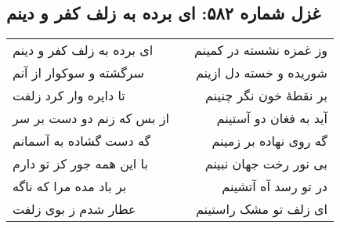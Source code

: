 \begin{center}
\section*{غزل شماره ۵۸۲: ای برده به زلف کفر و دینم}
\label{sec:582}
\begin{longtable}{l p{0.5cm} r}
ای برده به زلف کفر و دینم
&&
وز غمزه نشسته در کمینم
\\
سرگشته و سوکوار از آنم
&&
شوریده و خسته دل ازینم
\\
تا دایره وار کرد زلفت
&&
بر نقطهٔ خون نگر چنینم
\\
از بس که زنم دو دست بر سر
&&
آید به فغان دو آستینم
\\
گه دست گشاده به آسمانم
&&
گه روی نهاده بر زمینم
\\
با این همه جور کز تو دارم
&&
بی نور رخت جهان نبینم
\\
بر باد مده مرا که ناگه
&&
در تو رسد آه آتشینم
\\
عطار شدم ز بوی زلفت
&&
ای زلف تو مشک راستینم
\\
\end{longtable}
\end{center}
